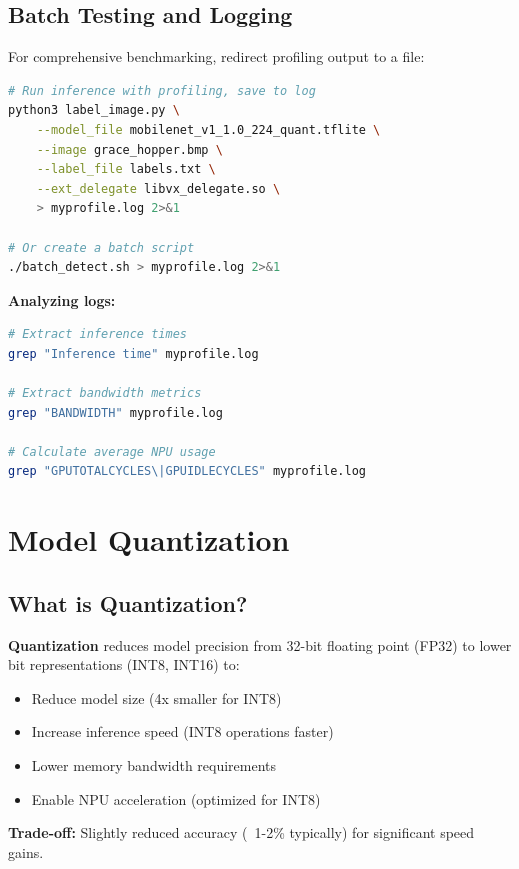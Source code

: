 \documentclass[12pt,a4paper]{report}
\begin{document}
\subsection{Batch Testing and Logging}

For comprehensive benchmarking, redirect profiling output to a file:

\begin{lstlisting}[language=bash]
# Run inference with profiling, save to log
python3 label_image.py \
    --model_file mobilenet_v1_1.0_224_quant.tflite \
    --image grace_hopper.bmp \
    --label_file labels.txt \
    --ext_delegate libvx_delegate.so \
    > myprofile.log 2>&1

# Or create a batch script
./batch_detect.sh > myprofile.log 2>&1
\end{lstlisting}

\textbf{Analyzing logs:}
\begin{lstlisting}[language=bash]
# Extract inference times
grep "Inference time" myprofile.log

# Extract bandwidth metrics
grep "BANDWIDTH" myprofile.log

# Calculate average NPU usage
grep "GPUTOTALCYCLES\|GPUIDLECYCLES" myprofile.log
\end{lstlisting}

\section{Model Quantization}

\subsection{What is Quantization?}

\textbf{Quantization} reduces model precision from 32-bit floating point (FP32) to lower bit representations (INT8, INT16) to:
\begin{itemize}
    \item Reduce model size (4x smaller for INT8)
    \item Increase inference speed (INT8 operations faster)
    \item Lower memory bandwidth requirements
    \item Enable NPU acceleration (optimized for INT8)
\end{itemize}

\textbf{Trade-off:} Slightly reduced accuracy (~1-2\% typically) for significant speed gains.
\end{document}
